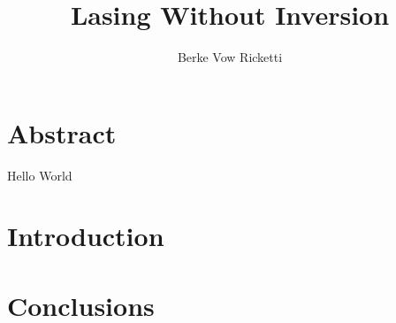 \documentclass{article}
\title{Lasing Without Inversion}
\author{Berke Vow Ricketti}
\begin{document}
\maketitle{}





\section{Abstract}

Hello World

\section{Introduction}


\section{Conclusions}
\end{document}
